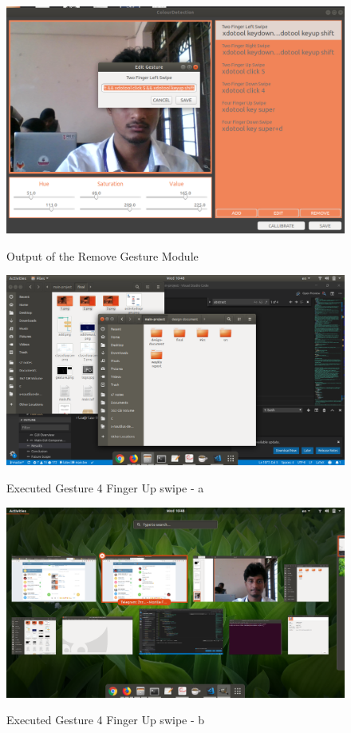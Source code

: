 \documentclass[11pt]{report}
\begin{document}
    \begin{figure}[H]
        \includegraphics[width=14cm]{3.png}
        \label{Remove Gesture}
        \caption{Output of the Remove Gesture Module}
        \end{figure}

    \begin{figure}[H]
        \includegraphics[width=14cm]{4.png}
        \label{Executed Gesture 4 Finger Up swipe - a}
        \caption{Executed Gesture 4 Finger Up swipe - a}
        \end{figure}
    \begin{figure}[H]
        \includegraphics[width=14cm]{5.png}
        \label{Executed Gesture 4 Finger Up swipe - b}
        \caption{Executed Gesture 4 Finger Up swipe - b}
        \end{figure}
\end{document}
